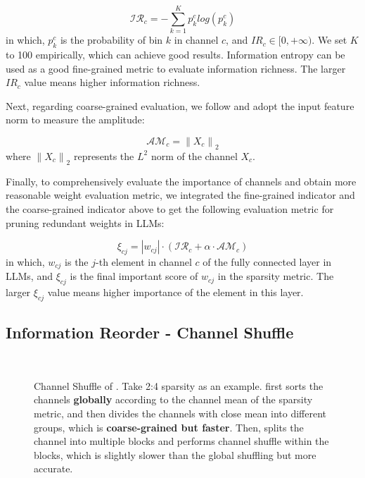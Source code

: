 \begin{equation}
 \mathcal{IR}_{c}=-\sum_{k=1}^{K}p_{k}^{c} log\left ( p_{k}^{c}\right ) 
\end{equation}
in which, $p_{k}^{c}$ is the probability of bin $k$ in channel $c$, and ${IR}_{c}\in [0,+\infty )$. 
We set $K$ to 100 empirically, which can achieve good results. 
Information entropy can be used as a good fine-grained metric to evaluate information richness. 
The larger ${IR}_{c}$ value means higher information richness. 

Next, regarding coarse-grained evaluation, we follow \cite{sun2023simple} and adopt the input feature norm to measure the amplitude:

\begin{equation}
 \mathcal{AM}_{c}=\left\| X_{c}\right\|_{2}
\end{equation}
where $\left\| X_{c}\right\|_{2}$ represents the $L^{2}$ norm of the channel $ X_{c}$.

Finally, to comprehensively evaluate the importance of channels and obtain more reasonable weight evaluation metric, we integrated the fine-grained indicator and the coarse-grained indicator above to get the following evaluation metric for pruning redundant weights in LLMs:

\begin{equation}
 \mathcal{\xi} _{cj}=\left| w_{cj}\right|\cdot \left ( \mathcal{IR}_{c}+\alpha\cdot \mathcal{AM}_{c} \right )
\label{metric}
\end{equation}
in which, $w_{cj}$ is the $j$-th element in channel $c$ of the fully connected layer in LLMs, and $\xi _{cj}$ is the final important score of $w_{cj}$ in the sparsity metric.  The larger $\xi _{cj}$ value means higher importance of the element in this layer.

\subsection{Information Reorder - Channel Shuffle}
\label{sec:CS}

\begin{figure}[t]
\centering
{} \\
\vspace{2mm}
\caption{Channel Shuffle of \name. Take 2:4 sparsity as an example. \name first sorts the channels \textbf{globally} according to the channel mean of the sparsity metric, and then divides the channels with close mean into different groups, which is \textbf{coarse-grained but faster}.  Then, \name splits the channel into multiple blocks and performs channel shuffle within the blocks, which is slightly slower than the global shuffling but more accurate.}
\label{fig:shuffle}
\end{figure}

